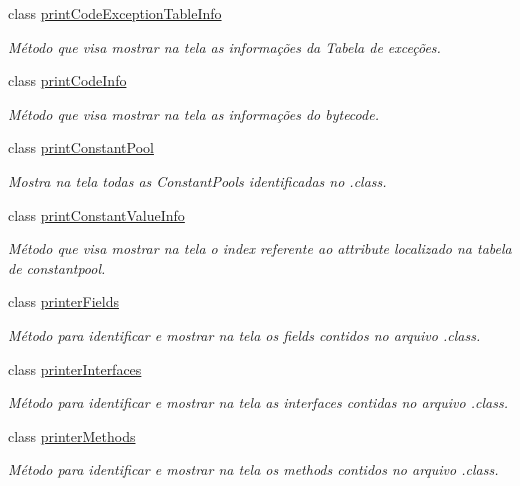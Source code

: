 \begin{DoxyCompactItemize}
class \hyperlink{classClassPrinter_1_1printCodeExceptionTableInfo}{print\+Code\+Exception\+Table\+Info}
\begin{DoxyCompactList}\small\item\em Método que visa mostrar na tela as informações da Tabela de exceções. \end{DoxyCompactList}\item 
class \hyperlink{classClassPrinter_1_1printCodeInfo}{print\+Code\+Info}
\begin{DoxyCompactList}\small\item\em Método que visa mostrar na tela as informações do bytecode. \end{DoxyCompactList}\item 
class \hyperlink{classClassPrinter_1_1printConstantPool}{print\+Constant\+Pool}
\begin{DoxyCompactList}\small\item\em Mostra na tela todas as Constant\+Pools identificadas no .class. \end{DoxyCompactList}\item 
class \hyperlink{classClassPrinter_1_1printConstantValueInfo}{print\+Constant\+Value\+Info}
\begin{DoxyCompactList}\small\item\em Método que visa mostrar na tela o index referente ao attribute localizado na tabela de constantpool. \end{DoxyCompactList}\item 
class \hyperlink{classClassPrinter_1_1printerFields}{printer\+Fields}
\begin{DoxyCompactList}\small\item\em Método para identificar e mostrar na tela os fields contidos no arquivo .class. \end{DoxyCompactList}\item 
class \hyperlink{classClassPrinter_1_1printerInterfaces}{printer\+Interfaces}
\begin{DoxyCompactList}\small\item\em Método para identificar e mostrar na tela as interfaces contidas no arquivo .class. \end{DoxyCompactList}\item 
class \hyperlink{classClassPrinter_1_1printerMethods}{printer\+Methods}
\begin{DoxyCompactList}\small\item\em Método para identificar e mostrar na tela os methods contidos no arquivo .class. \end{DoxyCompactList}\item 

\end{DoxyCompactItemize}
